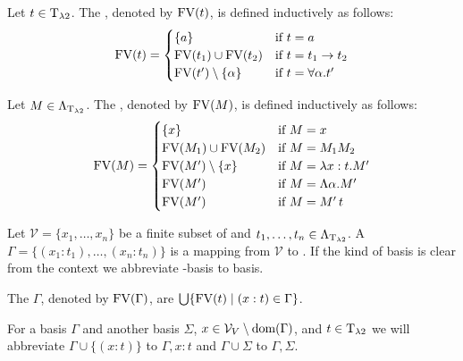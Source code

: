 \begin{definition}
	Let $t\in\text{T}_{\lambda2}$. The , denoted by $\text{FV}(t)$, is defined inductively as follows:
		\[\text{FV}(t)=
			\begin{cases}
				\{a\}                 & \text{if $t=a$}                    \\ 
				\text{FV}(t_1)\cup\text{FV}(t_2)  & \text{if $t=t_1\to t_2$}           \\
				\text{FV}(t')\setminus\{\alpha\} & \text{if $t=\forall\alpha.t'$}\\
			\end{cases}\]
			
	Let $M\in\Lambda_{\text{T}_{\lambda2}}$. The , denoted by $\text{FV}(M)$, is defined inductively as follows:
	\[\FV(M)=
		\begin{cases}
			\{x\}                 & \text{if $M=x$}                \\ %
			\FV(M_1)\cup\FV(M_2)  & \text{if $M=M_1M_2$}           \\
			\FV(M')\setminus\{x\} & \text{if $M=\lambda x:t.M'$}   \\
			\FV(M')               & \text{if $M=\Lambda\alpha.M'$} \\
			\FV(M')               & \text{if $M=M'\,t$}            \\
		\end{cases}\]
\end{definition}
\begin{definition} Let $\mathcal{V}=\{x_1,\dots,x_n\}$ be a finite subset of \lambdaValVar{} and $t_1,\dots,t_n\in\Lambda_{\text{T}_{\lambda2}}$.	A  $\Gamma=\{(x_1:t_1),\dots,(x_n:t_n)\}$ is a mapping from $\mathcal{V}$ to \lambdaTypes{}. If the kind of basis is clear from the context we abbreviate \lambdaTwo-basis to basis. 

The  $\Gamma$, denoted by $\text{FV}(\Gamma)$, are $\bigcup\{\text{FV}(t)\mid(x:t)\in\Gamma\}$.
\end{definition}

For a basis $\Gamma$ and another basis $\Sigma$, $x\in\mathcal{V}_V\setminus\text{dom}(\Gamma)$, and $t\in\text{T}_{\lambda2}$ we will abbreviate $\Gamma\cup\{(x:t)\}$ to $\Gamma,x:t$ and $\Gamma\cup\Sigma$ to $\Gamma,\Sigma$. %

